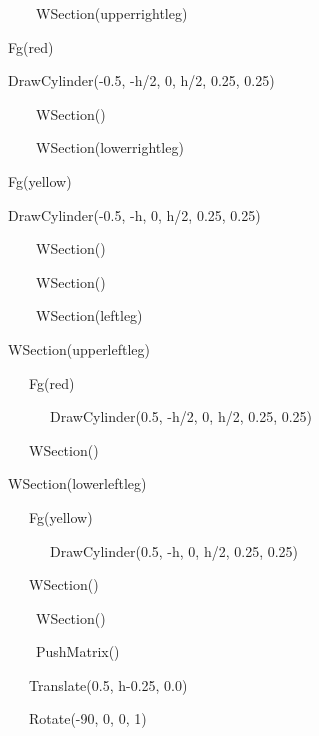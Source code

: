 \documentclass[letterpaper]{article}
\begin{document}
{\sffamily
\ \ \ \ \ \ WSection({\textquotedbl}upperrightleg{\textquotedbl})}

{\sffamily
\ \  Fg({\textquotedbl}red{\textquotedbl})}

{\sffamily
\ \  DrawCylinder(-0.5, -h/2, 0, h/2, 0.25, 0.25)}

{\sffamily
\ \ \ \ \ \ WSection()}

{\sffamily
\ \ \ \ \ \ WSection({\textquotedbl}lowerrightleg{\textquotedbl})}

{\sffamily
\ \  Fg({\textquotedbl}yellow{\textquotedbl})}

{\sffamily
\ \  DrawCylinder(-0.5, -h, 0, h/2, 0.25, 0.25)}

{\sffamily
\ \ \ \ \ \ WSection()}

{\sffamily
\ \ \ \ \ \ WSection()}

{\sffamily
\ \ \ \ \ \ WSection({\textquotedbl}leftleg{\textquotedbl})}

{\sffamily
\ \  WSection({\textquotedbl}upperleftleg{\textquotedbl})\ \ }

{\sffamily
\ \  \ \ \ Fg({\textquotedbl}red{\textquotedbl})}

{\sffamily
\ \ \ \ \  \ \ \ DrawCylinder(0.5, -h/2, 0, h/2, 0.25, 0.25)}

{\sffamily
\ \ \ \ \  WSection()}

{\sffamily
\ \  WSection({\textquotedbl}lowerleftleg{\textquotedbl})\ }

{\sffamily
\ \  \ \ \ Fg({\textquotedbl}yellow{\textquotedbl})}

{\sffamily
\ \ \ \ \  \ \ \ DrawCylinder(0.5, -h, 0, h/2, 0.25, 0.25)}

{\sffamily
\ \ \ \ \  WSection()}

{\sffamily
\ \ \ \ \ \ WSection()}

{\sffamily
\ \ \ \ \ \ PushMatrix()}

{\sffamily
\ \ \ \ \  Translate(0.5, h-0.25, 0.0)}

{\sffamily
\ \ \ \ \  Rotate(-90, 0, 0, 1)}
\end{document}
